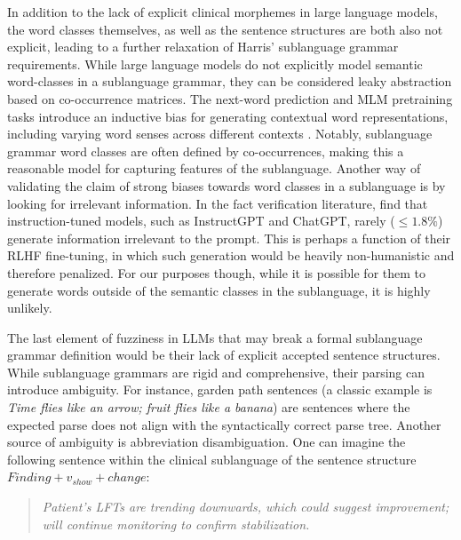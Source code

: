 In addition to the lack of explicit clinical morphemes in large language models, the word classes themselves, as well as the sentence structures are both also not explicit, leading to a further relaxation of Harris' sublanguage grammar requirements. While large language models do not explicitly model semantic word-classes in a sublanguage grammar, they can be considered leaky abstraction based on co-occurrence matrices. The next-word prediction and MLM pretraining tasks introduce an inductive bias for generating contextual word representations, including varying word senses across different contexts \cite{ethayarajh-2019-contextual}. Notably, sublanguage grammar word classes are often defined by co-occurrences, making this a reasonable model for capturing features of the sublanguage. Another way of validating the claim of strong biases towards word classes in a sublanguage is by looking for irrelevant information. In the fact verification literature, \citet{min-etal-2023-factscore} find that instruction-tuned models, such as InstructGPT and ChatGPT, rarely ($\leq 1.8\%$) generate information irrelevant to the prompt. This is perhaps a function of their RLHF fine-tuning, in which such generation would be heavily non-humanistic and therefore penalized. For our purposes though, while it is possible for them to generate words outside of the semantic classes in the sublanguage, it is highly unlikely. 

The last element of fuzziness in LLMs that may break a formal sublanguage grammar definition would be their lack of explicit accepted sentence structures. While sublanguage grammars are rigid and comprehensive, their parsing can introduce ambiguity. For instance, garden path sentences (a classic example is \emph{Time flies like an arrow; fruit flies like a banana}) are sentences where the expected parse does not align with the syntactically correct parse tree. Another source of ambiguity is abbreviation disambiguation. One can imagine the following sentence within the clinical sublanguage of the sentence structure $Finding + v_{show} + change$: 

\begin{quote}
\emph{Patient's LFTs are trending downwards, which could suggest improvement; will continue monitoring to confirm  stabilization.}
\end{quote}

